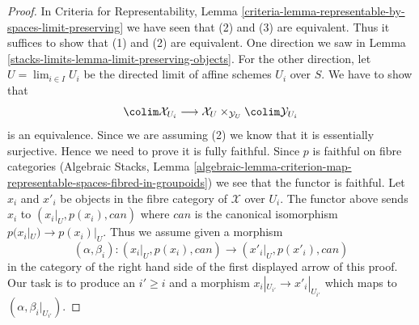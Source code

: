 \begin{proof}
In Criteria for Representability, Lemma
\ref{criteria-lemma-representable-by-spaces-limit-preserving}
we have seen that (2) and (3) are equivalent.
Thus it suffices to show that (1) and (2) are equivalent.
One direction we saw in Lemma \ref{stacks-limits-lemma-limit-preserving-objects}.
For the other direction, let $U = \lim_{i \in I} U_i$ be the directed limit
of affine schemes $U_i$ over $S$. We have to show that
$$
\colim \mathcal{X}_{U_i} \longrightarrow
\mathcal{X}_U \times_{\mathcal{Y}_U} \colim \mathcal{Y}_{U_i}
$$
is an equivalence. Since we are assuming (2) we know that it is essentially
surjective. Hence we need to prove it is fully faithful.
Since $p$ is faithful on fibre categories
(Algebraic Stacks, Lemma
\ref{algebraic-lemma-criterion-map-representable-spaces-fibred-in-groupoids})
we see that the functor is faithful. Let $x_i$ and $x'_i$ be objects
in the fibre category of $\mathcal{X}$ over $U_i$.
The functor above sends $x_i$ to $(x_i|_U, p(x_i), can)$ where
$can$ is the canonical isomorphism $p(x_i|_U) \to p(x_i)|_U$.
Thus we assume given a morphism
$$
(\alpha, \beta_i) : (x_i|_U, p(x_i), can) \longrightarrow
(x'_i|_U, p(x'_i), can)
$$
in the category of the right hand side of the first displayed arrow
of this proof. Our task is to produce an $i' \geq i$ and a morphism
$x_i|_{U_{i'}} \to x'_i|_{U_{i'}}$ which maps to
$(\alpha, \beta_i|_{U_{i'}})$.


\end{proof}
